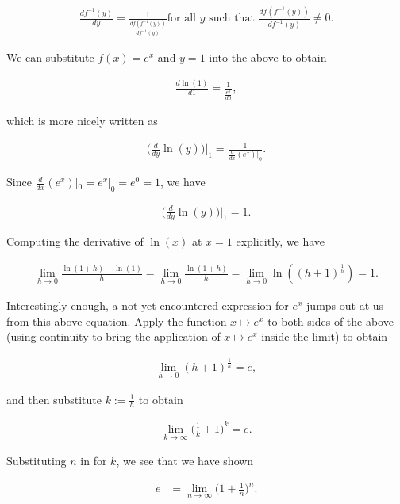 \begin{align*}
    \frac{df^{-1}(y)}{dy} = \frac{1}{\frac{df(f^{-1}(y))}{df^{-1}(y)}} \text{for all $y$ such that $\frac{df(f^{-1}(y))}{df^{-1}(y)} \neq 0$}.
\end{align*}

We can substitute $f(x) = e^x$ and $y = 1$ into the above to obtain

\begin{align*}
    \frac{d\ln(1)}{d1} = \frac{1}{\frac{e^0}{d0}},
\end{align*}

which is more nicely written as

\begin{align*}
    \Big( \frac{d}{dy} \ln(y) \Big)\Big|_1 = \frac{1}{\frac{d}{dx}(e^x)|_0}.
\end{align*}

Since $\frac{d}{dx}(e^x)|_0 = e^x|_0 = e^0 = 1$, we have

\begin{align*}
    \Big(\frac{d}{dy} \ln(y)\Big)\Big|_1 = 1.
\end{align*}

Computing the derivative of $\ln(x)$ at $x = 1$ explicitly, we have

\begin{align*}
    \lim_{h \rightarrow 0} \frac{\ln(1 + h) - \ln(1)}{h} = \lim_{h \rightarrow 0} \frac{\ln(1 + h)}{h} = \lim_{h \rightarrow 0} \ln((h + 1)^\frac{1}{h}) = 1.
\end{align*}

Interestingly enough, a not yet encountered expression for $e^x$ jumps out at us from this above equation. Apply the function $x \mapsto e^x$ to both sides of the above (using continuity to bring the application of $x \mapsto e^x$ inside the limit) to obtain

\begin{align*}
    \lim_{h \rightarrow 0} (h + 1)^{\frac{1}{h}} = e,
\end{align*}

and then substitute $k := \frac{1}{h}$ to obtain

\begin{align*}
   \lim_{k \rightarrow \infty} \Big( \frac{1}{k} + 1 \Big)^k = e.
\end{align*}

Substituting $n$ in for $k$, we see that we have shown

\begin{align*}
    e &= \lim_{n \rightarrow \infty} \Big(1 + \frac{1}{n} \Big)^n.
\end{align*}

